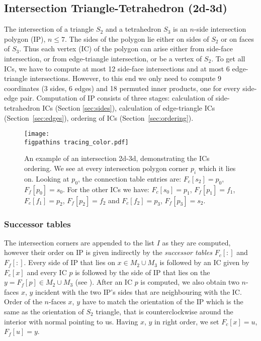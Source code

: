 \subsection{Intersection Triangle-Tetrahedron (2d-3d)}
The intersection of a triangle $S_2$ and a tetrahedron $S_3$ is an $n$-side intersection polygon (IP), $n\le 7$. The sides of the polygon
lie either on sides of $S_2$ or on faces of $S_3$. Thus each vertex (IC) of the polygon
can arise either from side-face intersection, or from edge-triangle intersection, or be a vertex of $S_2$.
To get all ICs, we have to compute at most 12 side-face intersections and at most 6 edge-triangle intersections. However,
to this end we only need to compute 9 \plucker coordinates (3 sides, 6 edges) and 18 permuted inner products, one for every side-edge pair.
Computation of IP consists of three stages: calculation of side-tetrahedron ICs (Section \ref{sec:sides}), 
calculation of edge-triangle ICs (Section~\ref{sec:edges}), ordering of ICs (Section~\ref{sec:ordering}).

\begin{figure}[!htb]
    \centering    
    \texttt{[image: \\figpathins tracing\_color.pdf]}
    \caption{An example of an intersection 2d-3d, demonstrating the ICs ordering. We see at every 
    intersection polygon corner $p_i$ which \nfaces it lies on. Looking at $p_0$, the connection table entries
    are: $F_c[s_2]=p_0$, $F_f[p_0]=s_0$. For the other ICs we have: $F_c[s_0]=p_1$, $F_f[p_1]=f_1$, $F_c[f_1]=p_2$, $F_f[p_2]=f_2$ and $F_c[f_2]=p_3$, $F_f[p_3]=s_2$.}
    \label{fig:tracing}
\end{figure}

\subsubsection{Successor tables}
The intersection corners are appended to the list $I$ as they are computed, however their order on IP is 
given indirectly by the \emph{successor tables} $F_c[:]$ and $F_f[:]$. Every side of IP that lies on \nface $x\in M_2\cup M_3$ is followed by an 
IC given by $F_c[x]$ and every IC $p$ is followed by the side of IP that lies on the \nface $y=F_f[p]\in M_2\cup M_3$ (see ).
After an IC $p$ is computed, we also obtain two $n$-faces $x$, $y$ incident with the two IP's sides that are neighbouring with the IC. 
Order of the $n$-faces $x$, $y$ have to match the orientation of the IP which is the same as the orientation of $S_2$ triangle, 
that is counterclockwise around the interior with normal pointing to us.
Having $x$, $y$ in right order, we set $F_c[x]=u$, $F_f[u]=y$.

